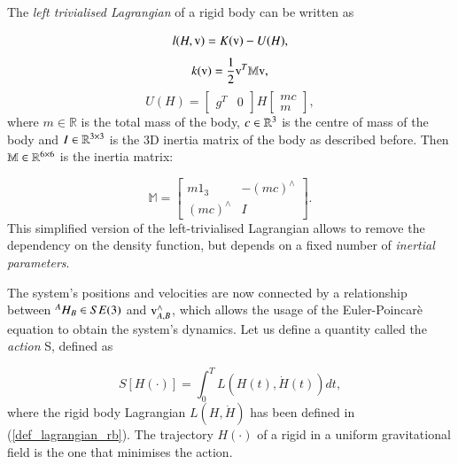 The \textit{left trivialised Lagrangian} of a rigid body can be written as

\begin{equation}\label{left_trivialised_lagrangian2}
    l(H,\text{v}) = K(\text{v}) - U(H),
\end{equation}
\begin{equation}\label{left_trivialised_kinetic_energy2}
    k(\text{v}) = \frac{1}{2} \text{v}^T \mathbb{M} \text{v},
\end{equation}
\begin{equation}\label{left_trivialised_potential_energy2}
    U(H) = \begin{bmatrix}
        g^T & 0
    \end{bmatrix} H \begin{bmatrix}
        mc\\
        m
    \end{bmatrix},
\end{equation}
where $m\in \mathbb{R}$ is the total mass of the body, $c \in \mathbb{R}^{3}$ is the centre of mass of the body and $I \in \mathbb{R}^{3\times 3}$ is the 3D inertia matrix of the body as described before. Then $\mathbb{M}\in \mathbb{R}^{6\times6}$ is the inertia matrix:

\begin{equation}\label{def_inertia_matrix}
    \mathbb{M} = \begin{bmatrix}
        m{1}_3 & -(mc)^{\wedge}\\
        (mc)^{\wedge} & I
    \end{bmatrix}.
\end{equation}
This simplified version of the left-trivialised Lagrangian allows to remove the dependency on the density function, but depends on a fixed number of \textit{inertial parameters}.

The system's positions and velocities are now connected by a relationship between ${}^{A}{H}_{B} \in SE(3)$ and $\text{v}_{A,B}^{\wedge}$, which allows the usage of the Euler-Poincarè equation to obtain the system's dynamics.
Let us define a quantity called the \textit{action} S, defined as

\begin{equation} \label{def_action}
    S[H(\cdot)] = \int_0^T L(H(t), \dot{H}(t)) dt,
\end{equation}
where the rigid body Lagrangian $L(H, \dot{H})$ has been defined in (\ref{def_lagrangian_rb}).
The trajectory $H(\cdot)$ of a rigid in a uniform gravitational field is the one that minimises the action. 

